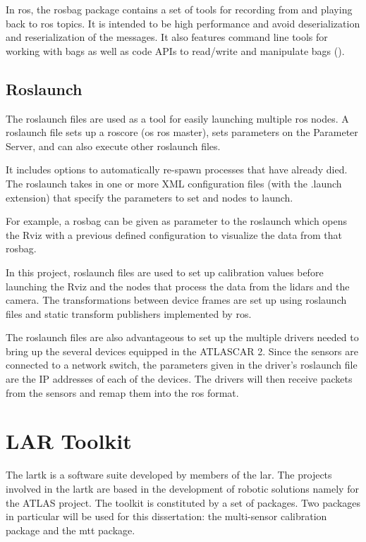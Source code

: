 In \gls{ros}, the rosbag package contains a set of tools for recording from and playing back to \gls{ros} topics. It is intended to be high performance and avoid deserialization and reserialization of the messages. It also features command line tools for working with bags as well as code APIs to read/write and manipulate bags (\cite{ROSWikia}).

\subsection{Roslaunch}
The roslaunch files are used as a tool for easily launching multiple \gls{ros} nodes. A roslaunch file sets up a roscore (os \gls{ros} master), sets parameters on the Parameter Server, and can also execute other roslaunch files. 

It includes options to automatically re-spawn processes that have already died. The roslaunch takes in one or more XML configuration files (with the .launch extension) that specify the parameters to set and nodes to launch.

For example, a rosbag can be given as parameter to the roslaunch which opens the Rviz with a previous defined configuration to visualize the data from that rosbag.

In this project, roslaunch files are used to set up calibration values before launching the Rviz and the nodes that process the data from the \gls{lidar}s and the camera. The transformations between device frames are set up using roslaunch files and static transform publishers implemented by \gls{ros}. 

The roslaunch files are also advantageous to set up the multiple drivers needed to bring up the several devices equipped in the ATLASCAR 2. Since the sensors are connected to a network switch, the parameters given in the driver's roslaunch file are the IP addresses of each of the devices. The drivers will then receive packets from the sensors and remap them into the \gls{ros} format.

\section{LAR Toolkit}

The \gls{lartk} is a software suite developed by members of the \gls{lar}. The projects involved in the \gls{lartk} are based in the development of robotic solutions namely for the ATLAS project. The toolkit is constituted by a set of packages. Two packages in particular will be used for this dissertation: the multi-sensor calibration package and the \gls{mtt} package.

